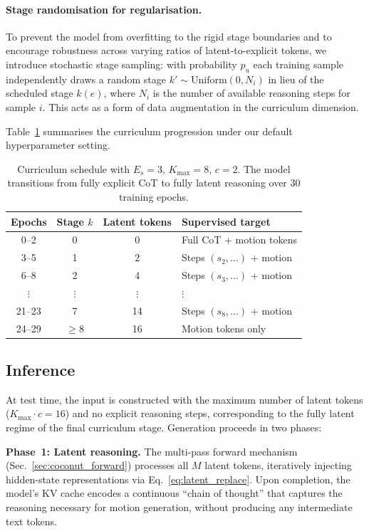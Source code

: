 \paragraph{Stage randomisation for regularisation.}
To prevent the model from overfitting to the rigid stage boundaries and to
encourage robustness across varying ratios of latent-to-explicit tokens,
we introduce stochastic stage sampling: with probability $p_u$ each
training sample independently draws a random stage
$k'{\sim}\mathrm{Uniform}(0, N_i)$ in lieu of the scheduled stage $k(e)$,
where $N_i$ is the number of available reasoning steps for sample $i$.
This acts as a form of data augmentation in the curriculum dimension.

Table~\ref{tab:curriculum} summarises the curriculum progression under our
default hyperparameter setting.

\begin{table}[t]
\centering
\caption{Curriculum schedule with $E_s{=}3$, $K_{\max}{=}8$, $c{=}2$.
  The model transitions from fully explicit CoT to fully latent reasoning
  over 30 training epochs.}
\label{tab:curriculum}
\setlength{\tabcolsep}{6pt}
\begin{tabular}{cccp{4.6cm}}
\toprule
Epochs & Stage $k$ & Latent tokens & Supervised target \\
\midrule
0--2   & 0 & 0  & Full CoT + motion tokens \\
3--5   & 1 & 2  & Steps $(s_2,\ldots)$ + motion \\
6--8   & 2 & 4  & Steps $(s_3,\ldots)$ + motion \\
$\vdots$ & $\vdots$ & $\vdots$ & $\vdots$ \\
21--23 & 7 & 14 & Steps $(s_8,\ldots)$ + motion \\
24--29 & ${\geq}8$ & 16 & Motion tokens only \\
\bottomrule
\end{tabular}
\end{table}

\subsection{Inference}
\label{sec:generation}

At test time, the input is constructed with the maximum number of latent
tokens ($K_{\max}{\cdot}c{=}16$) and no explicit reasoning steps,
corresponding to the fully latent regime of the final curriculum stage.
Generation proceeds in two phases:

\noindent\textbf{Phase~1: Latent reasoning.}
The multi-pass forward mechanism (Sec.~\ref{sec:coconut_forward})
processes all $M$ latent tokens, iteratively injecting hidden-state
representations via Eq.~\eqref{eq:latent_replace}.
Upon completion, the model's KV cache encodes a continuous ``chain of
thought'' that captures the reasoning necessary for motion generation,
without producing any intermediate text tokens.

